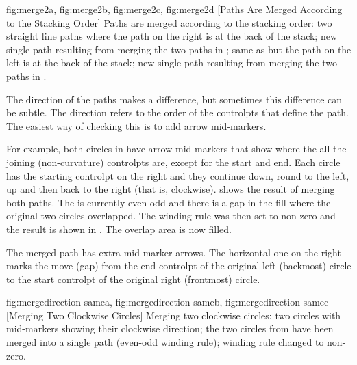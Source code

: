 {
  {fig:merge2a}{}{},
  {fig:merge2b}{}{},
  {fig:merge2c}{}{},
  {fig:merge2d}{}{}
}
[Paths Are Merged According to the Stacking Order]
{Paths are merged according to the stacking order:
 two straight line paths where the path 
on the right is at the back of the stack;
 new single path resulting from merging 
the two paths in ;
 same as  but the path on the left
is at the back of the stack;
 new single path resulting from merging 
the two paths in .}

The direction of the \glspl{path} makes a difference, but sometimes
this difference can be subtle. The direction refers to the order of
the \glspl{controlpt} that define the path. The easiest way of
checking this is to add arrow \hyperref[sec:markers]{mid-markers}.

For example, both circles in 
have arrow mid-markers that show where the all the joining
(non-curvature) \glspl{controlpt} are, except for the start and end.
Each circle has the starting \gls{controlpt} on the right and they
continue down, round to the left, up and then back to the right
(that is, clockwise).  shows the
result of merging both \glspl{path}. The  is currently
even-odd and there is a gap in the fill  where the
original two circles overlapped. The winding rule was then set to
non-zero and the result is shown in
. The overlap area is now
filled.

\begin{information}
The merged path has extra mid-marker arrows. The horizontal one on
the right marks the move (\gls{gap}) from the end \gls{controlpt} of the original left
(backmost) circle to the start \gls{controlpt} of the original right
(frontmost) circle.
\end{information}

{
  {fig:mergedirection-samea}{}{},
  {fig:mergedirection-sameb}{}{},
  {fig:mergedirection-samec}{}{}
}
[Merging Two Clockwise Circles]
{Merging two clockwise circles:
 two circles with mid-markers
showing their clockwise direction;
 the two circles from 
 have been merged into a single
path (even-odd winding rule);
 winding rule changed to
non-zero.}

